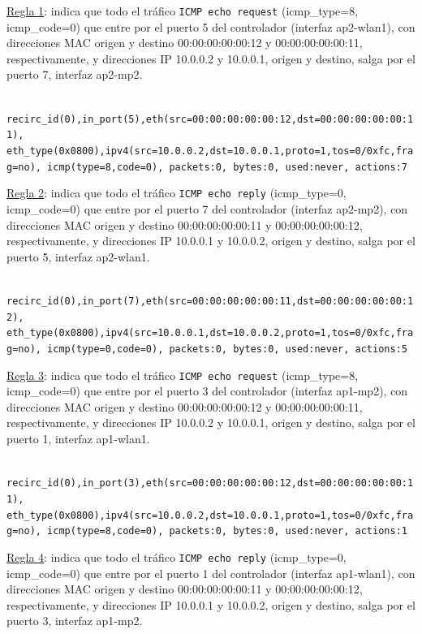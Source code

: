 \documentclass[a4paper,12pt,twoside,spanish]{book}
\begin{document}
\underline{Regla 1}: indica que todo el tráfico \texttt{ICMP echo request} (icmp\_type=8, icmp\_code=0) que entre por el puerto 5 del controlador (interfaz ap2-wlan1), con direcciones MAC origen y destino 00:00:00:00:00:12 y 00:00:00:00:00:11, respectivamente, y direcciones IP 10.0.0.2 y 10.0.0.1, origen y destino, salga por el puerto 7, interfaz ap2-mp2.\par 

\noindent\texttt{
	recirc\_id(0),in\_port(5),eth(src=00:00:00:00:00:12,dst=00:00:00:00:00:11),
	eth\_type(0x0800),ipv4(src=10.0.0.2,dst=10.0.0.1,proto=1,tos=0/0xfc,frag=no),
	icmp(type=8,code=0), packets:0, bytes:0, 	used:never, actions:7
}


\underline{Regla 2}: indica que todo el tráfico \texttt{ICMP echo reply} (icmp\_type=0, icmp\_code=0) que entre por el puerto 7 del controlador (interfaz ap2-mp2), con direcciones MAC origen y destino 00:00:00:00:00:11 y 00:00:00:00:00:12, respectivamente, y direcciones IP 10.0.0.1 y 10.0.0.2, origen y destino, salga por el puerto 5, interfaz ap2-wlan1.\par 

\noindent\texttt{
	recirc\_id(0),in\_port(7),eth(src=00:00:00:00:00:11,dst=00:00:00:00:00:12),
	eth\_type(0x0800),ipv4(src=10.0.0.1,dst=10.0.0.2,proto=1,tos=0/0xfc,frag=no),
	icmp(type=0,code=0), packets:0, bytes:0, 	used:never, actions:5
}

\underline{Regla 3}: indica que todo el tráfico \texttt{ICMP echo request} (icmp\_type=8, icmp\_code=0) que entre por el puerto 3 del controlador (interfaz ap1-mp2), con direcciones MAC origen y destino 00:00:00:00:00:12 y 00:00:00:00:00:11, respectivamente, y direcciones IP 10.0.0.2 y 10.0.0.1, origen y destino, salga por el puerto 1, interfaz ap1-wlan1.\par 

\noindent\texttt{
	recirc\_id(0),in\_port(3),eth(src=00:00:00:00:00:12,dst=00:00:00:00:00:11),
	eth\_type(0x0800),ipv4(src=10.0.0.2,dst=10.0.0.1,proto=1,tos=0/0xfc,frag=no),
	icmp(type=8,code=0), packets:0, bytes:0, 	used:never, actions:1
}

\underline{Regla 4}: indica que todo el tráfico \texttt{ICMP echo reply} (icmp\_type=0, icmp\_code=0) que entre por el puerto 1 del controlador (interfaz ap1-wlan1), con direcciones MAC origen y destino 00:00:00:00:00:11 y 00:00:00:00:00:12, respectivamente, y direcciones IP 10.0.0.1 y 10.0.0.2, origen y destino, salga por el puerto 3, interfaz ap1-mp2.\par 
\end{document}
